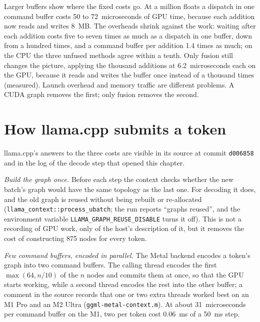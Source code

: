 
Larger buffers show where the fixed costs go. At a million floats a dispatch in
one command buffer costs 50 to 72~microseconds of GPU time, because each
addition now reads and writes 8~MB. The overheads shrink against the work:
waiting after each addition costs five to seven times as much as a dispatch in
one buffer, down from a hundred times, and a command buffer per addition 1.4
times as much; on the CPU the three unfused methods agree within a tenth. Only
fusion still changes the picture, applying the thousand additions at
6.2~microseconds each on the GPU, because it reads and writes the buffer once
instead of a thousand times (measured). Launch overhead and memory traffic are
different problems. A CUDA graph removes the first; only fusion removes the
second.

\section{How llama.cpp submits a token}

llama.cpp's answers to the three costs are visible in its source at commit
\texttt{d006858} and in the log of the decode step that opened this chapter.

\emph{Build the graph once.} Before each step the context checks whether the
new batch's graph would have the same topology as the last one. For decoding
it does, and the old graph is reused without being rebuilt or re-allocated
(\texttt{llama\_context::process\_ubatch}; the run reports ``graphs reused'',
and the environment variable \texttt{LLAMA\_GRAPH\_REUSE\_DISABLE} turns it
off). This is not a recording of GPU work, only of the host's description of
it, but it removes the cost of constructing 875 nodes for every token.

\emph{Few command buffers, encoded in parallel.} The Metal backend encodes a
token's graph into two command buffers. The calling thread encodes the first
$\max(64, n/10)$ of the $n$ nodes and commits them at once, so that the GPU
starts working, while a second thread encodes the rest into the other buffer;
a comment in the source records that one or two extra threads worked best on
an M1 Pro and an M2 Ultra (\texttt{ggml-metal-context.m}). At about
31~microseconds per command buffer on the M1, two per token cost 0.06~ms of a
50~ms step.

